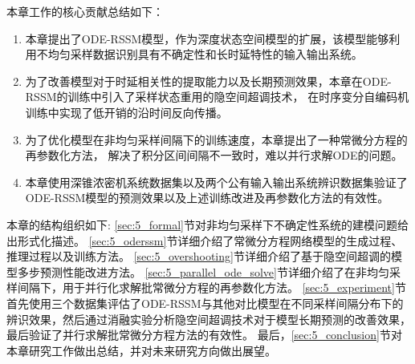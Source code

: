 本章工作的核心贡献总结如下：
\begin{enumerate}
\item 本章提出了ODE-RSSM模型，作为深度状态空间模型的扩展，该模型能够利用不均匀采样数据识别具有不确定性和长时延特性的输入输出系统。
\item 为了改善模型对于时延相关性的提取能力以及长期预测效果，本章在ODE-RSSM的训练中引入了采样状态重用的隐空间超调技术，
在时序变分自编码机训练中实现了低开销的沿时间反向传播。
\item 为了优化模型在非均匀采样间隔下的训练速度，本章提出了一种常微分方程的再参数化方法，
解决了积分区间间隔不一致时，难以并行求解ODE的问题。
\item 本章使用深锥浓密机系统数据集以及两个公有输入输出系统辨识数据集验证了ODE-RSSM模型的预测效果以及上述训练改进及再参数化方法的有效性。
\end{enumerate}

本章的结构组织如下:
\ref{sec:5_formal}节对非均匀采样下不确定性系统的建模问题给出形式化描述。
\ref{sec:5_oderssm}节详细介绍了常微分方程网络模型的生成过程、推理过程以及训练方法。
\ref{sec:5_overshooting}节详细介绍了基于隐空间超调的模型多步预测性能改进方法。
\ref{sec:5_parallel_ode_solve}节详细介绍了在非均匀采样间隔下，用于并行化求解批常微分方程的再参数化方法。
\ref{sec:5_experiment}节首先使用三个数据集评估了ODE-RSSM与其他对比模型在不同采样间隔分布下的辨识效果，然后通过消融实验分析隐空间超调技术对于模型长期预测的改善效果，最后验证了并行求解批常微分方程方法的有效性。
最后，\ref{sec:5_conclusion}节对本章研究工作做出总结，并对未来研究方向做出展望。



